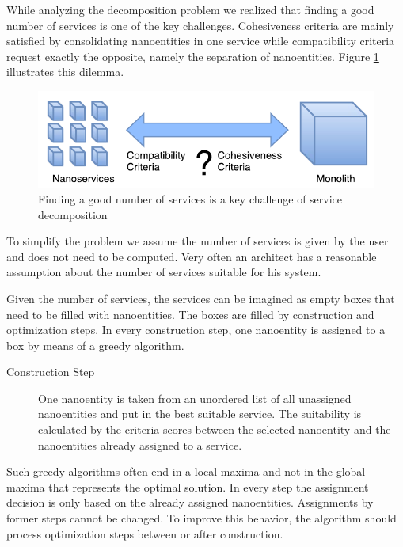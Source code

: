 While analyzing the decomposition problem we realized that finding a good number of services is one of the key challenges. Cohesiveness criteria are mainly satisfied by consolidating nanoentities in one service while compatibility criteria request exactly the opposite, namely the separation of nanoentities. Figure \ref{fig:numberOfServices} illustrates this dilemma.

\begin{figure}[H]
	\begin{center}
		\includegraphics[scale=1]{diagrams/HeuristicApproach.pdf}
	\end{center}
	\caption{Finding a good number of services is a key challenge of service decomposition}
	\label{fig:numberOfServices}
\end{figure}

To simplify the problem we assume the number of services is given by the user and does not need to be computed. Very often an architect has a reasonable assumption about the number of services suitable for his system. 

Given the number of services, the services can be imagined as empty boxes that need to be filled with nanoentities. The boxes are filled by construction and optimization steps. In every construction step, one nanoentity is assigned to a box by means of a greedy algorithm.

\begin{description}
	\item[Construction Step] One nanoentity is taken from an unordered list of all unassigned nanoentities and put in the best suitable service. The suitability is calculated by the criteria scores between the selected nanoentity and the nanoentities already assigned to a service. 
\end{description}

Such greedy algorithms often end in a local maxima and not in the global maxima that represents the optimal solution. In every step the assignment decision is only based on the already assigned nanoentities. Assignments by former steps cannot be changed. 
To improve this behavior, the algorithm should process optimization steps between or after construction. 

